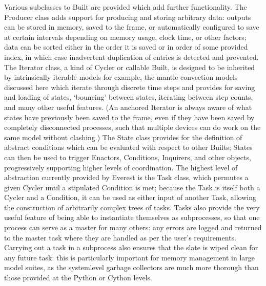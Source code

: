 \documentclass[letterpaper,10pt,english]{jupyterBook}
\begin{document}
\sphinxAtStartPar
Various subclasses to Built are provided which add further functionality. The Producer class adds support for producing and storing arbitrary data: outputs can be stored in memory, saved to the frame, or automatically configured to save at certain intervals depending on memory usage, clock time, or other factors; data can be sorted either in the order it is saved or in order of some provided index, in which case inadvertent duplication of entries is detected and prevented. The Iterator class, a kind of Cycler or callable Built, is designed to be inherited by intrinsically iterable models \sphinxhyphen{} for example, the mantle convection models discussed here which iterate through discrete time steps \sphinxhyphen{} and provides for saving and loading of states, ‘bouncing’ between states, iterating between step counts, and many other useful features. (An anchored Iterator is always aware of what states have previously been saved to the frame, even if they have been saved by completely disconnected processes, such that multiple devices can do work on the same model without clashing.) The State class provides for the definition of abstract conditions which can be evaluated with respect to other Builts; States can then be used to trigger Enactors, Conditions, Inquirers, and other objects, progressively supporting higher levels of coordination. The highest level of abstraction currently provided by Everest is the Task class, which permutes a given Cycler until a stipulated Condition is met; because the Task is itself both a Cycler and a Condition, it can be used as either input of another Task, allowing the construction of arbitrarily complex trees of tasks. Tasks also provide the very useful feature of being able to instantiate themselves as subprocesses, so that one process can serve as a master for many others: any errors are logged and returned to the master task where they are handled as per the user’s requirements. Carrying out a task in a subprocess also ensures that the slate is wiped clean for any future task: this is particularly important for memory management in large model suites, as the system\sphinxhyphen{}level garbage collectors are much more thorough than those provided at the Python or Cython levels.
\end{document}
